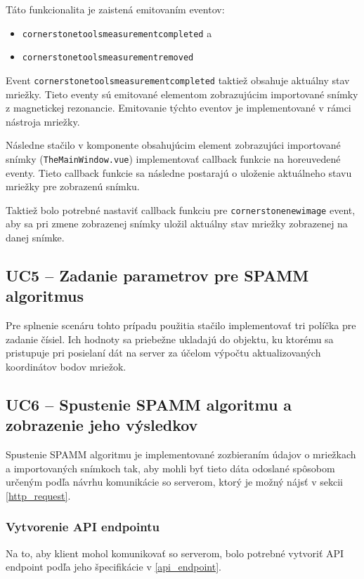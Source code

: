 Táto funkcionalita je zaistená emitovaním eventov:
\begin {itemize}
\item {\texttt{cornerstonetoolsmeasurementcompleted} a}
\item {\texttt{cornerstonetoolsmeasurementremoved}}
\end {itemize}

Event \texttt{cornerstonetoolsmeasurementcompleted} taktiež obsahuje aktuálny stav mriežky.
Tieto eventy sú emitované elementom zobrazujúcim importované snímky z magnetickej rezonancie. Emitovanie týchto eventov je implementované v rámci nástroja mriežky.

Následne stačilo v komponente obsahujúcim element zobrazujúci importované snímky (\texttt{TheMainWindow.vue}) implementovať callback funkcie na horeuvedené eventy. Tieto callback funkcie sa následne postarajú o uloženie aktuálneho stavu mriežky pre zobrazenú snímku. 

Taktiež bolo potrebné nastaviť callback funkciu pre \texttt{cornerstonenewimage} event, aby sa pri zmene zobrazenej snímky uložil aktuálny stav mriežky zobrazenej na danej snímke.

\clearpage

\subsection {UC5 -- Zadanie parametrov pre SPAMM algoritmus}
Pre splnenie scenáru tohto prípadu použitia stačilo implementovať tri políčka pre zadanie čísiel. Ich hodnoty sa priebežne ukladajú do objektu, ku ktorému sa pristupuje pri posielaní dát na server za účelom výpočtu aktualizovaných koordinátov bodov mriežok.

\subsection {UC6 -- Spustenie SPAMM algoritmu a zobrazenie jeho výsledkov}
Spustenie SPAMM algoritmu je implementované zozbieraním údajov o mriežkach a importovaných snímkoch tak, aby mohli byť tieto dáta odoslané spôsobom určeným podľa návrhu komunikácie so serverom, ktorý je možný nájsť v sekcii \ref{http_request}.

\subsubsection {Vytvorenie API endpointu}
Na to, aby klient mohol komunikovať so serverom, bolo potrebné vytvoriť API endpoint podľa jeho špecifikácie v \ref{api_endpoint}.

